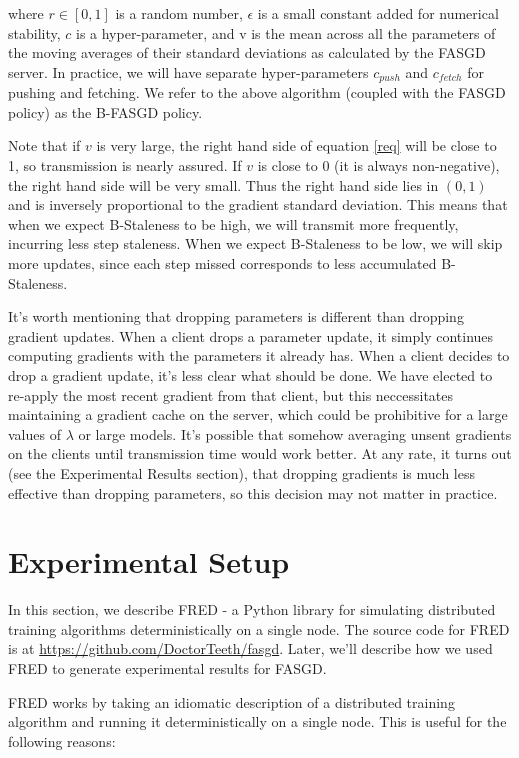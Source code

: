 \documentclass{article} %
\begin{document}
where $r \in [0,1] $ is a random number, $\epsilon$ is a small constant added for numerical stability,
$c$ is a hyper-parameter,
and v is the mean across all the parameters of the moving averages of their standard deviations as calculated by the FASGD server.
In practice, we will have separate hyper-parameters $c_{push}$ and $c_{fetch}$ for pushing and fetching.
We refer to the above algorithm (coupled with the FASGD policy) as the B-FASGD policy.

Note that if $v$ is very large, the right hand side of equation \ref{req} will be close to 1, so transmission is nearly assured.
If $v$ is close to 0 (it is always non-negative), the right hand side will be very small.
Thus the right hand side lies in $(0,1)$ and is inversely proportional to the gradient standard deviation.
This means that when we expect B-Staleness to be high, we will transmit more frequently,
incurring less step staleness.
When we expect B-Staleness to be low, we will skip more updates,
since each step missed corresponds to less accumulated B-Staleness.

It's worth mentioning that dropping parameters is different than dropping gradient updates.
When a client drops a parameter update, it simply continues computing gradients with the parameters it already has.
When a client decides to drop a gradient update, it's less clear what should be done.
We have elected to re-apply the most recent gradient from that client,
but this neccessitates maintaining a gradient cache on the server,
which could be prohibitive for a large values of $\lambda$ or large models.
It's possible that somehow averaging unsent gradients on the clients until transmission time would work better.
At any rate, it turns out (see the Experimental Results section), that dropping gradients is much less effective than dropping
parameters, so this decision may not matter in practice.


\section{Experimental Setup}
\label{sec:impl}
\vspace{-0.1mm}
In this section, we describe FRED - a Python library for simulating distributed training algorithms
deterministically on a single node.
The source code for FRED is at \href{https://github.com/DoctorTeeth/fasgd}{https://github.com/DoctorTeeth/fasgd}.
Later, we'll describe how we used FRED to generate experimental results for FASGD.

FRED works by taking an idiomatic description of a distributed training algorithm and running it
deterministically on a single node. This is useful for the following reasons:
\end{document}

